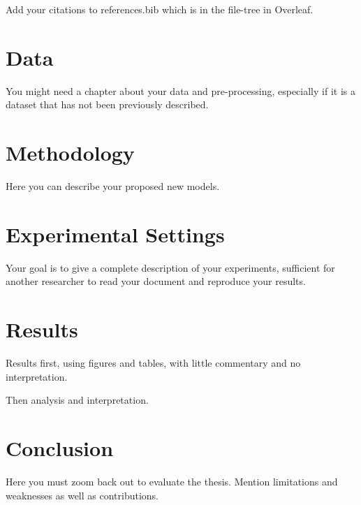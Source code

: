 \documentclass[oneside,12pt]{Classes/RoboticsLaTeX}
\begin{document}
Add your citations to references.bib which is in the file-tree in Overleaf.




\chapter{Data}
\label{chap:data}

You might need a chapter about your data and pre-processing, especially if it is a dataset that has not been previously described.


\chapter{Methodology}
\label{chap:methodology}

Here you can describe your proposed new models.

\chapter{Experimental Settings}
\label{chap:experimental}

Your goal is to give a complete description of your experiments, sufficient for another researcher to read your document and reproduce your results.

\chapter{Results}
\label{chap:resutls}

Results first, using figures and tables, with little commentary and no interpretation.

Then analysis and interpretation.

\chapter{Conclusion}
\label{chap:conclusion}

Here you must zoom back out to evaluate the thesis. Mention limitations and weaknesses as well as contributions.

\renewcommand{\bibname}{References}           %



\end{document}

